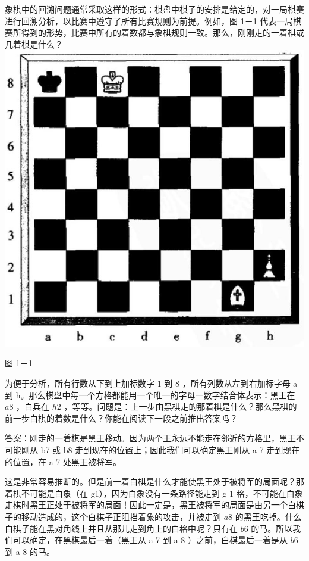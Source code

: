 象棋中的回溯问题通常采取这样的形式：棋盘中棋子的安排是给定的，对一局棋赛进行回溯分析，以比赛中遵守了所有比赛规则为前提。例如，图 1－1 代表一局棋赛所得到的形势，比赛中所有的着数都与象棋规则一致。那么，刚刚走的一着棋或几着棋是什么？\\
\includegraphics[width=\textwidth]{images/2025_05_15_6a28331d5e7c993ad07ag-085.jpg}

图 1－1

为便于分析，所有行数从下到上加标数字 1 到 8 ，所有列数从左到右加标字母 a 到 h。那么棋盘中每一个方格都能用一个唯一的字母一数字结合体表示：黑王在 $a 8$ ，白兵在 $h 2$ ，等等。问题是：上一步由黑棋走的那着棋是什么？那么黑棋的前一步白棋的着数是什么？你能在阅读下一段之前推出答案吗？

答案：刚走的一着棋是黑王移动。因为两个王永远不能走在邻近的方格里，黑王不可能刚从 b7 或 b8 走到现在的位置上；因此我们可以确定黑王刚从 a 7 走到现在的位置，在 a 7 处黑王被将军。

这是非常容易推断的。但是前一着白棋是什么才能使黑王处于被将军的局面呢？那着棋不可能是白象（在 g1），因为白象没有一条路径能走到 g 1 格，不可能在白象走棋时黑王正处于被将军的局面！因此一定是，黑王被将军的局面是由另一个白棋子的移动造成的，这个白棋子正阻挡着象的攻击，并被走到 $a 8$ 的黑王吃掉。什么白棋子能在黑对角线上并且从那儿走到角上的白格中呢？只有在 $b 6$ 的马。所以我们可以确定，在黑棋最后一着（黑王从 a 7 到 a 8 ）之前，白棋最后一着是从 $b 6$ 到 a 8 的马。

